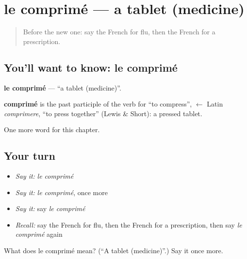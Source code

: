 \section[le comprimé]{le comprimé — a tablet (medicine)}

\label{lesson:FR-C215-comprime}



\begin{quote}
Before the new one: say the French for flu, then the French for a prescription.
\end{quote}

\subsection*{You'll want to know: le comprimé}
\textbf{le comprimé} — \textquotedblleft{}a tablet (medicine)\textquotedblright{}.

\begin{cousinweb}
\textbf{comprimé} is the past participle of the verb for \textquotedblleft{}to compress\textquotedblright{}, $\leftarrow$ Latin \emph{comprimere}, \textquotedblleft{}to press together\textquotedblright{} (Lewis \& Short): a pressed tablet.
\end{cousinweb}

\begin{grammarlens}[title={What you've built}]
One more word for this chapter.
\end{grammarlens}

\subsection*{Your turn}
\begin{itemize}
\raggedright
  \item \emph{Say it:} \emph{le comprimé}
  \item \emph{Say it:} \emph{le comprimé}, once more
  \item \emph{Say it:} say \emph{le comprimé}
  \item \emph{Recall:} say the French for flu, then the French for a prescription, then say \emph{le comprimé} again
\end{itemize}

\begin{tcolorbox}[breakable,colback=teal!4,colframe=teal!35!black,title={Before you move on}]
What does le comprimé mean? (\textquotedblleft{}A tablet (medicine)\textquotedblright{}.) Say it once more.
\end{tcolorbox}
